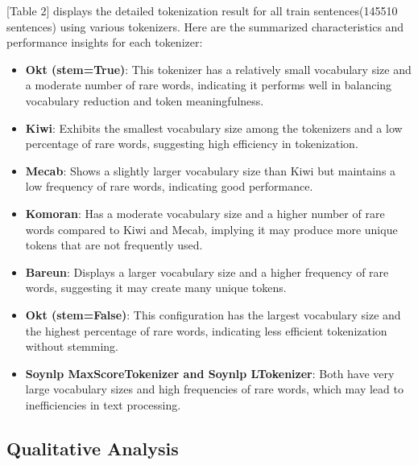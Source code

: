 \documentclass{article}
\begin{document}
[Table 2] displays the detailed tokenization result for all train sentences(145510 sentences) using various tokenizers. Here are the summarized characteristics and performance insights for each tokenizer:

\begin{itemize}
    \item \textbf{Okt (stem=True)}: This tokenizer has a relatively small vocabulary size and a moderate number of rare words, indicating it performs well in balancing vocabulary reduction and token meaningfulness.
    
    \item \textbf{Kiwi}: Exhibits the smallest vocabulary size among the tokenizers and a low percentage of rare words, suggesting high efficiency in tokenization.
    
    \item \textbf{Mecab}: Shows a slightly larger vocabulary size than Kiwi but maintains a low frequency of rare words, indicating good performance.
    
    \item \textbf{Komoran}: Has a moderate vocabulary size and a higher number of rare words compared to Kiwi and Mecab, implying it may produce more unique tokens that are not frequently used.
    
    \item \textbf{Bareun}: Displays a larger vocabulary size and a higher frequency of rare words, suggesting it may create many unique tokens.
    
    \item \textbf{Okt (stem=False)}: This configuration has the largest vocabulary size and the highest percentage of rare words, indicating less efficient tokenization without stemming.
    
    \item \textbf{Soynlp MaxScoreTokenizer and Soynlp LTokenizer}: Both have very large vocabulary sizes and high frequencies of rare words, which may lead to inefficiencies in text processing.
\end{itemize}


\subsection{Qualitative Analysis}
\end{document}
